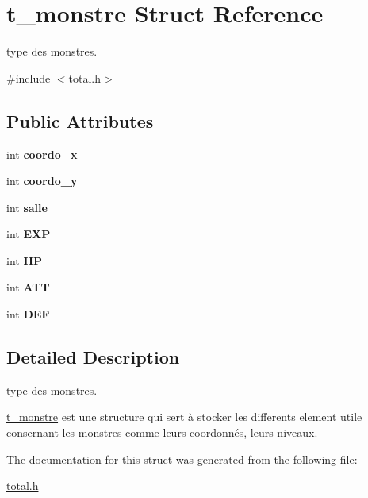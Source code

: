 \hypertarget{structt__monstre}{}\section{t\+\_\+monstre Struct Reference}
\label{structt__monstre}


type des monstres.  




{\ttfamily \#include $<$total.\+h$>$}

\subsection*{Public Attributes}
\begin{DoxyCompactItemize}
\item 
int {\bfseries coordo\+\_\+x}\hypertarget{structt__monstre_a42819071d12918855eda37dd9d05a587}{}\label{structt__monstre_a42819071d12918855eda37dd9d05a587}

\item 
int {\bfseries coordo\+\_\+y}\hypertarget{structt__monstre_a383ff5a904ebc0f98bdab99293c97199}{}\label{structt__monstre_a383ff5a904ebc0f98bdab99293c97199}

\item 
int {\bfseries salle}\hypertarget{structt__monstre_ad45c60cbcf47e11e06f82d9ebf4900ad}{}\label{structt__monstre_ad45c60cbcf47e11e06f82d9ebf4900ad}

\item 
int {\bfseries E\+XP}\hypertarget{structt__monstre_a18e858f4e45b07e77c6ecbdf75a099e2}{}\label{structt__monstre_a18e858f4e45b07e77c6ecbdf75a099e2}

\item 
int {\bfseries HP}\hypertarget{structt__monstre_a1c4c4424d4d5ff449c5e2a1c2752670a}{}\label{structt__monstre_a1c4c4424d4d5ff449c5e2a1c2752670a}

\item 
int {\bfseries A\+TT}\hypertarget{structt__monstre_a42bf712bc741f80355f81ce421f83bb2}{}\label{structt__monstre_a42bf712bc741f80355f81ce421f83bb2}

\item 
int {\bfseries D\+EF}\hypertarget{structt__monstre_ae77a0567bdf7c7eb72a5a30a3cdd438f}{}\label{structt__monstre_ae77a0567bdf7c7eb72a5a30a3cdd438f}

\end{DoxyCompactItemize}


\subsection{Detailed Description}
type des monstres. 

\hyperlink{structt__monstre}{t\+\_\+monstre} est une structure qui sert à stocker les differents element utile consernant les monstres comme leurs coordonnés, leurs niveaux. 

The documentation for this struct was generated from the following file\+:\begin{DoxyCompactItemize}
\item 
\hyperlink{total_8h}{total.\+h}\end{DoxyCompactItemize}
